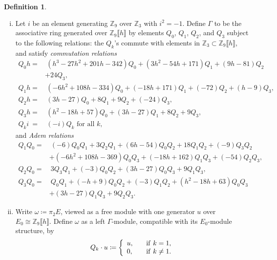 \documentclass{rs}
\theoremstyle{definition}
\newtheorem{defn}[thm]{Definition}
\theoremstyle{remark}
\newcommand{\mb}[1]{\mathbb{#1}}
\newcommand{\BZ}{{\mb Z}}
\newcommand{\G}{\Gamma}
\begin{document}
\begin{defn}
\label{def}
 \mbox{}
 \begin{enumerate}[(i)]
  \item \label{gamma} Let $i$ be an element generating $\BZ_9$ over $\BZ_3$ with $i^2 = -1$.  
  Define $\G$ to be the associative ring generated over $\BZ_9 \llbracket h \rrbracket$ 
  by elements $Q_0$, $Q_1$, $Q_2$, and $Q_3$ subject to the following relations: 
  the $Q_k$'s commute with elements in $\BZ_3 \subset \BZ_9 \llbracket h \rrbracket$, 
  and satisfy {\em commutation relations} 
  \begin{equation*}
  \begin{split}
   Q_0 h = & ~ (h^3 - 27 h^2 + 201 h - 342) Q_0 + (3 h^2 - 54 h + 171) Q_1 + (9 h - 81) Q_2 ~ \\
           & + 24 Q_3, 
  \end{split}
  \end{equation*}
  \begin{equation*}
  \begin{split}
   Q_1 h = & ~ (-6 h^2 + 108 h - 334) Q_0 + (-18 h + 171) Q_1 + (-72) Q_2 + (h - 9) Q_3, \\
   Q_2 h = & ~ (3 h - 27) Q_0 + 8 Q_1 + 9 Q_2 + (-24) Q_3, \\
   Q_3 h = & ~ (h^2 - 18 h + 57) Q_0 + (3 h - 27) Q_1 + 8 Q_2 + 9 Q_3, \\
   Q_k i ~ = & ~ (-i) Q_k \text{~for all~} k, 
  \end{split}
  \end{equation*}
  and {\em Adem relations} 
  \begin{equation*}
  \begin{split}
   Q_1Q_0 = & ~ (-6) Q_0Q_1 + 3 Q_2Q_1 + (6 h - 54) Q_0Q_2 + 18 Q_1Q_2 + (-9) Q_3Q_2 \\
            & + (-6 h^2 + 108 h - 369) Q_0Q_3 + (-18 h + 162) Q_1Q_3 + (-54) Q_2Q_3, ~ \\
   Q_2Q_0 = & ~ 3 Q_3Q_1 + (-3) Q_0Q_2 + (3 h - 27) Q_0Q_3 + 9 Q_1Q_3, \\
   Q_3Q_0 = & ~ Q_0Q_1 + (-h + 9) Q_0Q_2 + (-3) Q_1Q_2 + (h^2 - 18 h + 63) Q_0Q_3 \\
            & + (3 h - 27) Q_1Q_3 + 9 Q_2Q_3.  
  \end{split}
  \end{equation*}

  \item \label{omega} Write $\omega \coloneqq \pi_2 E$, viewed as a free 
  module with one generator $u$ over 
  $E_0 \cong \BZ_9 \llbracket h \rrbracket$.  Define $\omega$ as a left 
  $\G$-module, compatible with its $E_0$-module structure, by 
  \[
   Q_k \cdot u \coloneqq \left\{
   \begin{array}{ll}
     u,  & \quad {\rm if}~k = 1, \\
     0,  & \quad {\rm if}~k \neq 1.  
   \end{array}
   \right.
  \]
 \end{enumerate}
\end{defn}
\end{document}

